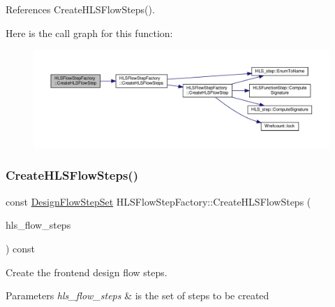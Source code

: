 References Create\+H\+L\+S\+Flow\+Steps().

Here is the call graph for this function\+:
\nopagebreak
\begin{figure}[H]
\begin{center}
\leavevmode
\includegraphics[width=350pt]{dd/d39/classHLSFlowStepFactory_a2a56c258177069c03018a8c4bb5f487b_cgraph}
\end{center}
\end{figure}
\mbox{\label{classHLSFlowStepFactory_a68d109cc1cd6b661a29f89bf76199e93}} 
\subsubsection{\texorpdfstring{Create\+H\+L\+S\+Flow\+Steps()}{CreateHLSFlowSteps()}\hspace{0.1cm}{\footnotesize\ttfamily [1/3]}}
{\footnotesize\ttfamily const \hyperlink{classDesignFlowStepSet}{Design\+Flow\+Step\+Set} H\+L\+S\+Flow\+Step\+Factory\+::\+Create\+H\+L\+S\+Flow\+Steps (\begin{DoxyParamCaption}\item[{const \hyperlink{classCustomUnorderedSet}{Custom\+Unordered\+Set}$<$ std\+::pair$<$ \hyperlink{hls__step_8hpp_ada16bc22905016180e26fc7e39537f8d}{H\+L\+S\+Flow\+Step\+\_\+\+Type}, \hyperlink{hls__step_8hpp_a5fdd2edf290c196531d21d68e13f0e74}{H\+L\+S\+Flow\+Step\+Specialization\+Const\+Ref} $>$$>$ \&}]{hls\+\_\+flow\+\_\+steps }\end{DoxyParamCaption}) const}



Create the frontend design flow steps. 


\begin{DoxyParams}{Parameters}
{\em hls\+\_\+flow\+\_\+steps} & is the set of steps to be created \\
\hline
\end{DoxyParams}


